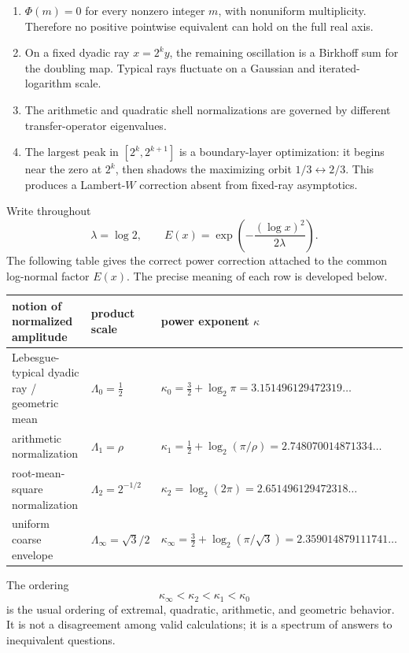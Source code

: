 \documentclass[11pt,oneside]{article}
\theoremstyle{definition}
\theoremstyle{remark}
\begin{document}
\begin{enumerate}
\item \(\Phi(m)=0\) for every nonzero integer \(m\), with nonuniform
multiplicity.  Therefore no positive pointwise equivalent can hold on the full
real axis.
\item On a fixed dyadic ray \(x=2^ky\), the remaining oscillation is a Birkhoff
sum for the doubling map.  Typical rays fluctuate on a Gaussian and
iterated-logarithm scale.
\item The arithmetic and quadratic shell normalizations are governed by
different transfer-operator eigenvalues.
\item The largest peak in \([2^k,2^{k+1}]\) is a boundary-layer optimization:
it begins near the zero at \(2^k\), then shadows the maximizing orbit
\(1/3\leftrightarrow2/3\).  This produces a Lambert-\(W\) correction absent
from fixed-ray asymptotics.
\end{enumerate}

Write throughout
\begin{equation}
 \lambda=\log2,
 \qquad
 E(x)=\exp\!\left(-\frac{(\log x)^2}{2\lambda}\right).
 \label{eq:lambda-E}
\end{equation}
The following table gives the correct power correction attached to the common
log-normal factor \(E(x)\).  The precise meaning of each row is developed below.

\begin{center}
\begin{tabularx}{0.96\textwidth}{@{}>{\raggedright\arraybackslash}Xll@{}}
\toprule
notion of normalized amplitude & product scale & power exponent \(\kappa\)\\
\midrule
Lebesgue-typical dyadic ray / geometric mean
 & \(\Lambda_0=\tfrac12\)
 & \(\kappa_0=\tfrac32+\log_2\pi=3.151496129472319\ldots\)\\[0.25em]
arithmetic normalization
 & \(\Lambda_1=\rho\)
 & \(\kappa_1=\tfrac12+\log_2(\pi/\rho)=2.748070014871334\ldots\)\\[0.25em]
root-mean-square normalization
 & \(\Lambda_2=2^{-1/2}\)
 & \(\kappa_2=\log_2(2\pi)=2.651496129472318\ldots\)\\[0.25em]
uniform coarse envelope
 & \(\Lambda_\infty=\sqrt3/2\)
 & \(\kappa_\infty=\tfrac32+\log_2(\pi/\sqrt3)=2.359014879111741\ldots\)\\
\bottomrule
\end{tabularx}
\end{center}

The ordering
\[
 \kappa_\infty<\kappa_2<\kappa_1<\kappa_0
\]
is the usual ordering of extremal, quadratic, arithmetic, and geometric
behavior.  It is not a disagreement among valid calculations; it is a spectrum
of answers to inequivalent questions.
\end{document}
